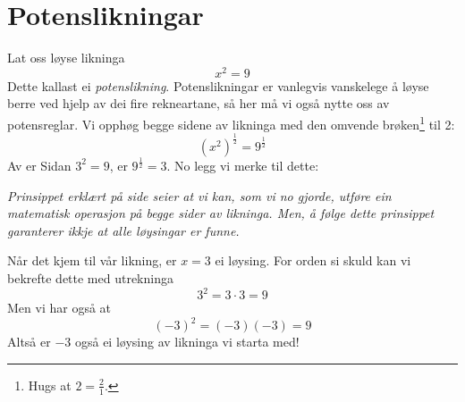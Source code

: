 \newpage
{}
\section{Potenslikningar}
Lat oss løyse likninga
\[ x^2=9 \]
Dette kallast ei \textit{potenslikning}. Potenslikningar er vanlegvis vanskelege å løyse berre ved hjelp av dei fire rekneartane, så her må vi også nytte oss av potensreglar. Vi opphøg begge sidene av likninga med den omvende brøken\footnote{Hugs at $ 2=\frac{2}{1} $.} til 2:
\[ \left(x^2\right)^\frac{1}{2}=9^\frac{1}{2} \]
Av  er
Sidan $ 3^2=9 $, er $ 9^\frac{1}{2}=3 $. No legg vi merke til dette: \vsk

\textit{Prinsippet erklært på side \pageref{principle} seier at vi kan, som vi no gjorde, utføre ein matematisk operasjon på begge sider av likninga. Men, å følge dette prinsippet garanterer ikkje at alle løysingar er funne.} \\ \vsk

Når det kjem til vår likning, er $ {x=3} $ ei løysing. For orden si skuld kan vi bekrefte dette med utrekninga
\[ 3^2=3\cdot3=9 \]
Men vi har også at
\[ (-3)^2=(-3)(-3)=9 \]
Altså er $ -3 $ også ei løysing av likninga vi starta med! \regv

